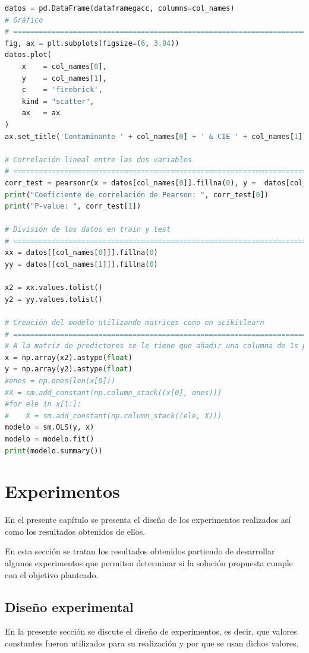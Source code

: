 \begin{lstlisting}[language=Python, caption=Generación de los modelos de regresión lineal, basicstyle=\tiny, label=lst:c4]
datos = pd.DataFrame(dataframegacc, columns=col_names)
# Gráfico
# ==============================================================================
fig, ax = plt.subplots(figsize=(6, 3.84))
datos.plot(
    x    = col_names[0],
    y    = col_names[1],
    c    = 'firebrick',
    kind = "scatter",
    ax   = ax
)
ax.set_title('Contaminante ' + col_names[0] + ' & CIE ' + col_names[1])

# Correlación lineal entre las dos variables
# ==============================================================================
corr_test = pearsonr(x = datos[col_names[0]].fillna(0), y =  datos[col_names[1]].fillna(0))
print("Coeficiente de correlación de Pearson: ", corr_test[0])
print("P-value: ", corr_test[1])

# División de los datos en train y test
# ==============================================================================
xx = datos[[col_names[0]]].fillna(0)
yy = datos[[col_names[1]]].fillna(0)
        
x2 = xx.values.tolist()
y2 = yy.values.tolist()

# Creación del modelo utilizando matrices como en scikitlearn
# ==============================================================================
# A la matriz de predictores se le tiene que añadir una columna de 1s para el intercept del modelo
x = np.array(x2).astype(float)
y = np.array(y2).astype(float)
#ones = np.ones(len(x[0]))
#X = sm.add_constant(np.column_stack((x[0], ones)))
#for ele in x[1:]:
#    X = sm.add_constant(np.column_stack((ele, X)))
modelo = sm.OLS(y, x)
modelo = modelo.fit()
print(modelo.summary())
\end{lstlisting}

\chapter{Experimentos}
En el presente capítulo se presenta el diseño de los experimentos realizados así como los resultados obtenidos de ellos.

En esta sección se tratan los resultados obtenidos partiendo de desarrollar algunos experimentos que permiten determinar si la solución propuesta cumple con el objetivo planteado.

\section{Diseño experimental}
En la presente sección se discute el diseño de experimentos, es decir, que valores constantes fueron utilizados para su realización y por que se usan dichos valores.

